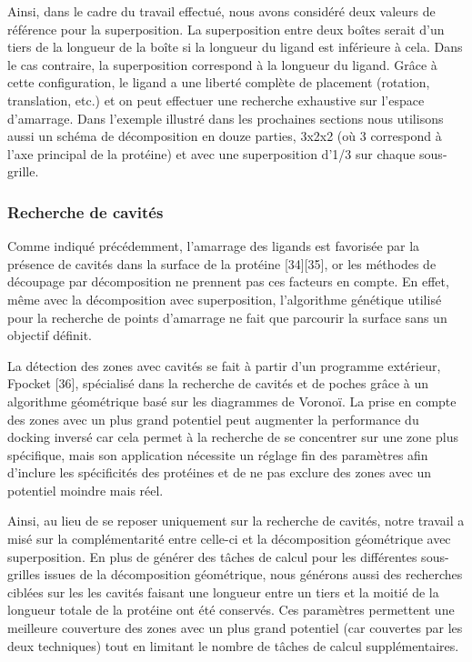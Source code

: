 Ainsi, dans le cadre du travail effectué, nous avons considéré deux valeurs de référence pour la superposition. La superposition entre deux boîtes serait d'un tiers de la longueur de la boîte si la longueur du ligand est inférieure à cela. Dans le cas contraire, la superposition correspond à la longueur du ligand. Grâce à cette configuration, le ligand a une liberté complète de placement (rotation, translation, etc.) et on peut effectuer une recherche exhaustive sur l'espace d'amarrage. Dans l'exemple illustré dans les prochaines sections nous utilisons aussi un schéma de décomposition en douze parties, 3x2x2 (où 3 correspond à l'axe principal de la protéine) et avec une superposition d'1/3 sur chaque sous-grille. 

\subsubsection{Recherche de cavités}
Comme indiqué précédemment, l'amarrage des ligands est favorisée par la présence de cavités dans la surface de la protéine [34][35], or les méthodes de découpage par décomposition ne prennent pas ces facteurs en compte. En effet, même avec la décomposition avec superposition, l'algorithme génétique utilisé pour la recherche de points d'amarrage ne fait que parcourir la surface sans un objectif définit. 

La détection des zones avec cavités se fait à partir d'un programme extérieur, Fpocket [36], spécialisé dans la recherche de cavités et de poches grâce à un algorithme géométrique basé sur les diagrammes de Voronoï. La prise en compte des zones avec un plus grand potentiel peut augmenter la performance du docking inversé car cela permet à la recherche de se concentrer sur une zone plus spécifique, mais son application nécessite un réglage fin des paramètres afin d'inclure les spécificités des protéines et de ne pas exclure des zones avec un potentiel moindre mais réel. 

Ainsi, au lieu de se reposer uniquement sur la recherche de cavités, notre travail a misé sur la complémentarité entre celle-ci et la décomposition géométrique avec superposition. En plus de générer des tâches de calcul pour les différentes sous-grilles issues de la décomposition géométrique, nous générons aussi des recherches ciblées sur les les cavités faisant une longueur entre un tiers et la moitié de la longueur totale de la protéine ont été conservés. Ces paramètres permettent une meilleure couverture des zones avec un plus grand potentiel (car couvertes par les deux techniques) tout en limitant le nombre de tâches de calcul supplémentaires.


